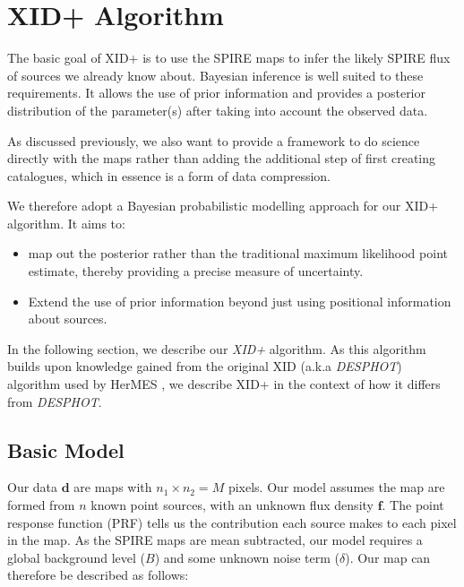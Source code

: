\documentclass[useAMS,usenatbib]{mnras}
\begin{document}
\section{XID+ Algorithm}\label{sec:XID+}
The basic goal of XID+ is to use the SPIRE maps to infer the likely SPIRE flux of sources we already know about. Bayesian inference is well suited to these requirements. It allows the use of prior information and provides a posterior distribution of the parameter(s) after taking into account the observed data.  

As discussed previously, we also want to provide a framework to do science directly with the maps rather than adding the additional step of first creating catalogues, which in essence is a form of data compression.

We therefore adopt a Bayesian probabilistic modelling approach for our XID+ algorithm. It aims to:
\begin{itemize}
\item map out the posterior rather than the traditional maximum likelihood point estimate, thereby providing a precise measure of uncertainty. 
\item Extend the use of prior information beyond just using positional information about sources.
\end{itemize}

In the following section, we describe our \emph{XID+} algorithm. As this algorithm builds upon knowledge gained from the original XID (a.k.a \emph{DESPHOT}) algorithm used by HerMES \citep{Roseboom:2010, Roseboom:2011, Wang:2014}, we describe XID+ in the context of how it differs from \emph{DESPHOT}. 


\subsection{Basic Model}
Our data $\mathbf{d}$ are maps with $n_1 \times n_2 = M$ pixels. Our model assumes the map are formed from $n$ known point sources, with an unknown flux density $\mathbf{f}$. The point response function (PRF) tells us the contribution each source makes to each pixel in the map. As the SPIRE maps are mean subtracted, our model requires a global background level ($B$) and some unknown noise term ($\delta$). Our map can therefore be described as follows:
\end{document}
